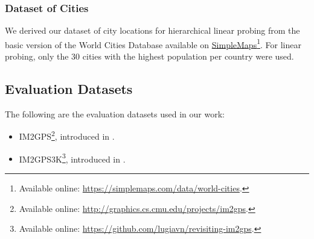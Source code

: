 \documentclass{article}
\begin{document}
 \subsubsection{Dataset of Cities}
 \label{app:listcities}

 We derived our dataset of city locations for hierarchical linear probing from the basic version of the World Cities Database available on \href{https://simplemaps.com/data/world-cities}{SimpleMaps}\footnote{Available online: \href{https://simplemaps.com/data/world-cities}{https://simplemaps.com/data/world-cities}.}. For linear probing, only the 30 cities with the highest population per country were used.

\subsection{Evaluation Datasets}

The following are the evaluation datasets used in our work:

\begin{itemize}
    \item IM2GPS\footnote{Available online: \href{http://graphics.cs.cmu.edu/projects/im2gps/}{http://graphics.cs.cmu.edu/projects/im2gps}.}, introduced in \citet{hays_2008}.
    \item IM2GPS3K\footnote{Available online: \href{https://github.com/lugiavn/revisiting-im2gps}{https://github.com/lugiavn/revisiting-im2gps}.}, introduced in \citet{vo_et_al}.
\end{itemize}
\end{document}
